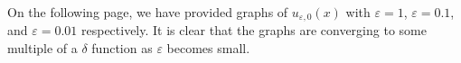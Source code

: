 \documentclass[12pt,reqno]{amsart}
\numberwithin{equation}{section}  %
\newcommand{\ee}{\varepsilon}
\begin{document}
          On the following page, we have provided graphs of
          $u_{\ee,0}(x)$ with $\ee = 1$, $\ee = 0.1$, and $\ee = 0.01$
          respectively. It is clear that the graphs are converging to some
          multiple of a $\delta$ function as $\ee$ becomes small.
          \newpage
\begin{figure}[!t]
  \begin{center}
  \vspace{-30mm}
  \hspace{-15mm}
\hspace{-40mm}
\\
\vspace{-70mm}
\hspace{-15mm}
\end{center}
\end{figure}
%
%
%
\end{document}
